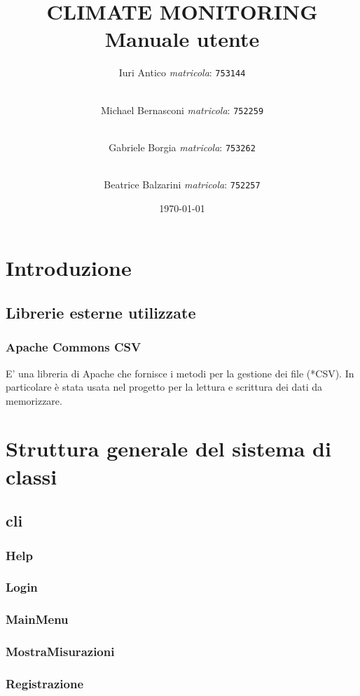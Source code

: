 \documentclass[a4paper, 12pt,twoside]{article}
\title {
	CLIMATE MONITORING \\
	{Manuale utente}}
\author{
	Iuri Antico \textit{matricola}:
	\texttt{753144}
	\and \\
	Michael Bernasconi \textit{matricola}:
	\texttt{752259}
	\and \\
	Gabriele Borgia \textit{matricola}:
	\texttt{753262}
	\and \\
	Beatrice Balzarini \textit{matricola}:
	\texttt{752257}
}
\date{\today}
\begin{document}
	
	\makeatletter
	\begin{titlepage}
		\maketitle
	\end{titlepage}
	\makeatother

	\tableofcontents

	
	\section{Introduzione}
		\subsection{Librerie esterne utilizzate}
			\subsubsection{Apache Commons CSV}
			 E' una libreria di Apache che fornisce i metodi per la gestione dei file (*CSV). In particolare è stata usata nel progetto per la lettura e scrittura dei dati da memorizzare.
			
			
	\section{Struttura generale del sistema di classi}
		\subsection{cli}
			\subsubsection{Help}
			\subsubsection{Login}
			\subsubsection{MainMenu}
			\subsubsection{MostraMisurazioni}
			\subsubsection{Registrazione}
\end{document}
